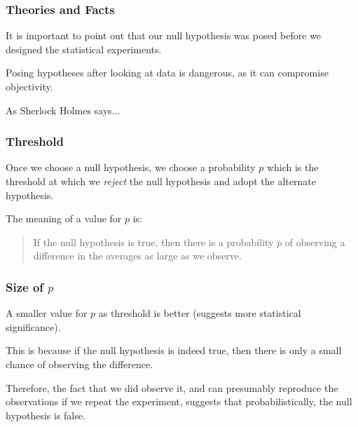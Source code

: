 \begin{frame}
\frametitle{Theories and Facts}
\begin{changemargin}{1cm}

It is important to point out that our null hypothesis was posed
before we designed the statistical experiments. 

Posing hypotheses
after looking at data is dangerous, as it 
can compromise objectivity.

As Sherlock Holmes says...

\end{changemargin}
\end{frame}


\begin{frame}
\frametitle{Threshold}
\begin{changemargin}{1cm}

Once we choose a null hypothesis,
we choose a probability $p$ which is the threshold at which
we \emph{reject} the null hypothesis and adopt the alternate
hypothesis. 

The meaning of a value for $p$ is:
\begin{quote}
    If the null hypothesis is true, then
    there is a probability $p$ of observing a difference
    in the averages as large as we observe.
\end{quote}


\end{changemargin}
\end{frame}

\begin{frame}
\frametitle{Size of $p$}
\begin{changemargin}{1cm}

A smaller
value for $p$ as threshold is better (suggests more
statistical significance). 

This is because if the null hypothesis
is indeed true, then there is only a small chance of observing
the difference. 

Therefore,
the fact that we did observe it, and can presumably reproduce
the observations if we repeat the experiment, suggests that
probabilistically, the null hypothesis is false.

\end{changemargin}
\end{frame}

